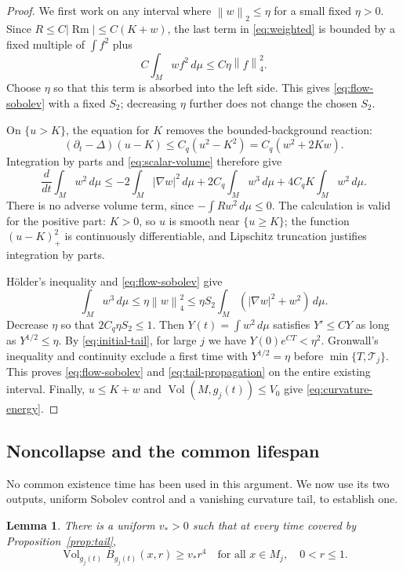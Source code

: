 \documentclass[11pt]{article}
\newtheorem{lemma}[theorem]{Lemma}
\theoremstyle{definition}
\theoremstyle{remark}
\numberwithin{equation}{section}
\DeclareMathOperator{\Rm}{Rm}
\DeclareMathOperator{\Vol}{Vol}
\newcommand{\dd}{\,d\mu}
\newcommand{\norm}[1]{\left\lVert #1\right\rVert}
\begin{document}
\begin{proof}
We first work on any interval where $\norm w_2\le\eta$ for a small
fixed $\eta>0$. Since $R\le C|\Rm|\le C(K+w)$, the last term in
\eqref{eq:weighted} is bounded by a fixed multiple of $\int f^2$ plus
\[
 C\int_Mwf^2\dd\le C\eta\norm f_4^2.
\]
Choose $\eta$ so that this term is absorbed into the left side.
This gives \eqref{eq:flow-sobolev} with a fixed $S_2$; decreasing $\eta$
further does not change the chosen $S_2$.

On $\{u>K\}$, the equation for $K$ removes the bounded-background
reaction:
\[
 (\partial_t-\Delta)(u-K)\le C_q(u^2-K^2)
 =C_q(w^2+2Kw).
\]
Integration by parts and \eqref{eq:scalar-volume} therefore give
\begin{equation}\label{eq:tail-energy}
 \frac d{dt}\int_Mw^2\dd
 \le-2\int_M|\nabla w|^2\dd
       +2C_q\int_Mw^3\dd+4C_qK\int_Mw^2\dd.
\end{equation}
There is no adverse volume term, since $-\int Rw^2\dd\le0$.
The calculation is valid for the positive part: $K>0$, so $u$ is smooth
near $\{u\ge K\}$; the function $(u-K)_+^2$ is continuously
differentiable, and Lipschitz truncation justifies integration by parts.

H\"older's inequality and \eqref{eq:flow-sobolev} give
\[
 \int_Mw^3\dd\le\eta\norm w_4^2
 \le\eta S_2\int_M(|\nabla w|^2+w^2)\dd.
\]
Decrease $\eta$ so that $2C_q\eta S_2\le1$.
Then $Y(t)=\int w^2\dd$ satisfies $Y'\le CY$ as long as
$Y^{1/2}\le\eta$. By \eqref{eq:initial-tail}, for large $j$ we have
$Y(0)e^{CT}<\eta^2$. Gronwall's inequality and continuity exclude a
first time with $Y^{1/2}=\eta$ before $\min\{T,\mathcal T_j\}$.
This proves \eqref{eq:flow-sobolev} and \eqref{eq:tail-propagation}
on the entire existing interval. Finally,
$u\le K+w$ and $\Vol(M,g_j(t))\le V_0$ give
\eqref{eq:curvature-energy}.
\end{proof}

\subsection{Noncollapse and the common lifespan}

No common existence time has been used in this argument. We now use
its two outputs, uniform Sobolev control and a vanishing curvature tail,
to establish one.

\begin{lemma}\label{lem:noncollapse}
There is a uniform $v_*>0$ such that at every time covered by
Proposition~\ref{prop:tail},
\begin{equation}\label{eq:noncollapse}
 \Vol_{g_j(t)}B_{g_j(t)}(x,r)\ge v_*r^4
 \quad\text{for all }x\in M_j,\quad 0<r\le1.
\end{equation}
\end{lemma}
\end{document}
